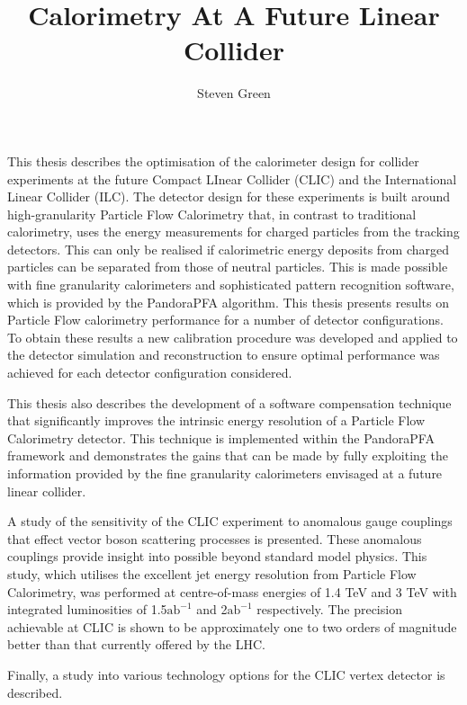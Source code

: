 \documentclass{article}
\begin{document}
\title{Calorimetry At A Future Linear Collider}
\author{Steven Green}
\date{}
\maketitle



This thesis describes the optimisation of the calorimeter design for collider experiments
at the future Compact LInear Collider (CLIC) and the International Linear Collider (ILC). 
The detector design for these experiments is built around high-granularity Particle Flow Calorimetry
that, in contrast to traditional calorimetry, uses the energy measurements for charged particles from 
the tracking detectors. This can only be realised if calorimetric energy deposits from
charged particles can be separated from those of neutral particles. This is made possible with fine
granularity calorimeters and sophisticated pattern recognition software, which is provided by the
PandoraPFA algorithm. This thesis presents results on Particle Flow calorimetry performance for a number
of detector configurations. To obtain these results a new calibration procedure was developed 
and applied to the detector simulation and reconstruction to ensure optimal performance 
was achieved for each detector configuration considered.

This thesis also describes the development of a software compensation technique that significantly improves the
intrinsic energy resolution of a Particle Flow Calorimetry detector. This technique is implemented
within the PandoraPFA framework and demonstrates the gains that can be made by fully exploiting
the information provided by the fine granularity calorimeters envisaged at a future linear collider.

A study of the sensitivity of the CLIC experiment to anomalous gauge couplings that
effect vector boson scattering processes is presented. These anomalous couplings provide insight
into possible beyond standard model physics. This study, which utilises the excellent jet energy resolution from
Particle Flow Calorimetry, was performed at centre-of-mass energies of 1.4 TeV and 3 TeV with integrated 
luminosities of 1.5$\text{ab}^{-1}$ and 2$\text{ab}^{-1}$ respectively. The precision achievable at CLIC is shown to be approximately 
one to two orders of magnitude better than that currently offered by the LHC.

Finally, a study into various technology options for the CLIC vertex detector is described.
\end{document}
